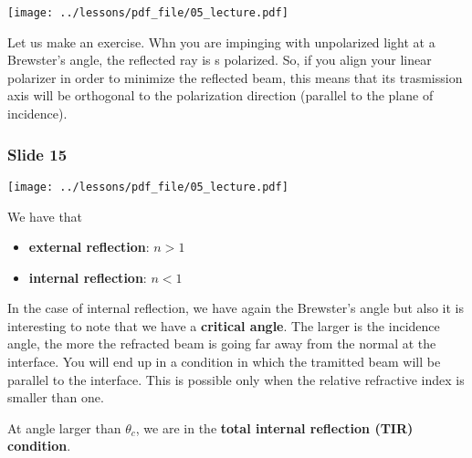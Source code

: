 \documentclass[../main/main.tex]{subfiles}
\begin{document}
\begin{minipage}[]{0.5\linewidth}
\centering
\texttt{[image: ../lessons/pdf\_file/05\_lecture.pdf]}
\end{minipage}
\hspace{0.3cm}\vspace{0.3cm}
\begin{minipage}[c]{0.47\linewidth}

Let us make an exercise.  Whn you are impinging with unpolarized light at a Brewster's angle, the reflected ray is s polarized. So, if you align your linear polarizer in order to minimize the reflected beam, this means that its trasmission axis will be orthogonal to the polarization direction (parallel to the plane of incidence).

\end{minipage}

\subsubsection*{Slide 15}

\begin{minipage}[]{0.5\linewidth}
\centering
\texttt{[image: ../lessons/pdf\_file/05\_lecture.pdf]}
\end{minipage}
\hspace{0.3cm}\vspace{0.3cm}
\begin{minipage}[c]{0.47\linewidth}

We have that
\begin{itemize}
\item \textbf{external reflection}: \( n>1 \)
\item \textbf{internal reflection}: \( n<1 \)
\end{itemize}

In the case of internal reflection, we have again the Brewster's angle but also it is interesting to note that we have a \textbf{critical angle}. The larger is the incidence angle, the more the refracted beam is going far away from the normal at the interface. You will end up in a condition in which the tramitted beam will be parallel to the interface. This is possible only when the relative refractive index is smaller than one.

At angle larger than \( \theta _c \), we are in the \textbf{total internal reflection (TIR) condition}.


\end{minipage}
\end{document}
